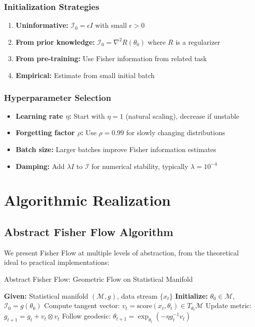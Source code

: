 \documentclass[11pt]{article}
\begin{document}
\subsubsection{Initialization Strategies}

\begin{enumerate}
\item \textbf{Uninformative:} $\mathcal{I}_0 = \epsilon I$ with small $\epsilon > 0$
\item \textbf{From prior knowledge:} $\mathcal{I}_0 = \nabla^2 R(\theta_0)$ where $R$ is a regularizer
\item \textbf{From pre-training:} Use Fisher information from related task
\item \textbf{Empirical:} Estimate from small initial batch
\end{enumerate}

\subsubsection{Hyperparameter Selection}

\begin{itemize}
\item \textbf{Learning rate $\eta$:} Start with $\eta = 1$ (natural scaling), decrease if unstable
\item \textbf{Forgetting factor $\rho$:} Use $\rho = 0.99$ for slowly changing distributions
\item \textbf{Batch size:} Larger batches improve Fisher information estimates
\item \textbf{Damping:} Add $\lambda I$ to $\mathcal{I}$ for numerical stability, typically $\lambda = 10^{-4}$
\end{itemize}

\section{Algorithmic Realization}

\subsection{Abstract Fisher Flow Algorithm}

We present Fisher Flow at multiple levels of abstraction, from the theoretical ideal to practical implementations:

\begin{algorithm}[h]
\caption{Abstract Fisher Flow: Geometric Flow on Statistical Manifold}
\label{alg:abstract_lpi}
\begin{algorithmic}[1]
\State \textbf{Given:} Statistical manifold $(\mathcal{M}, g)$, data stream $\{x_t\}$
\State \textbf{Initialize:} $\theta_0 \in \mathcal{M}$, $\mathcal{I}_0 = g(\theta_0)$
\State Compute tangent vector: $v_t = \text{score}(x_t, \theta_t) \in T_{\theta_t}\mathcal{M}$
\State Update metric: $g_{t+1} = g_t + v_t \otimes v_t$
\State Follow geodesic: $\theta_{t+1} = \exp_{\theta_t}(-\eta g_t^{-1} v_t)$
\EndWhile
\end{algorithmic}
\end{algorithm}
\end{document}
